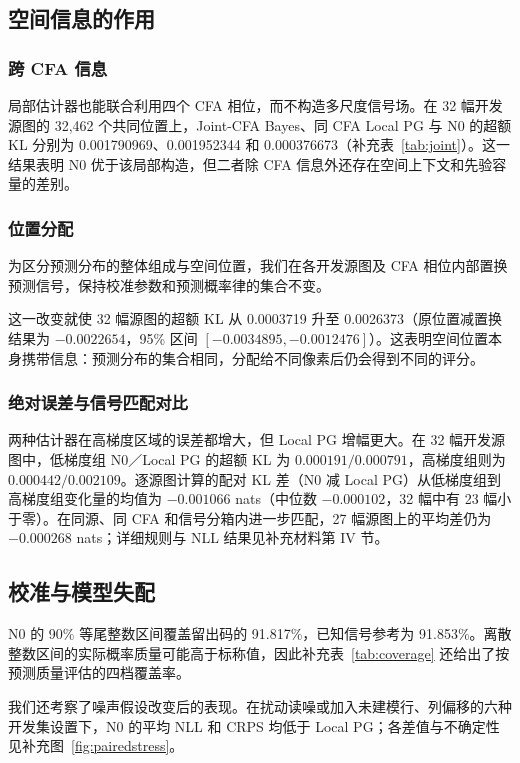 \documentclass[10pt,twocolumn,journal]{IEEEtran}
\begin{document}
\subsection{空间信息的作用}
\subsubsection{跨 CFA 信息}
局部估计器也能联合利用四个 CFA 相位，而不构造多尺度信号场。在 32 幅开发源图的 32,462 个共同位置上，Joint-CFA Bayes、同 CFA Local PG 与 N0 的超额 KL 分别为 0.001790969、0.001952344 和 0.000376673（补充表~\ref{tab:joint}）。这一结果表明 N0 优于该局部构造，但二者除 CFA 信息外还存在空间上下文和先验容量的差别。

\subsubsection{位置分配}
为区分预测分布的整体组成与空间位置，我们在各开发源图及 CFA 相位内部置换预测信号，保持校准参数和预测概率律的集合不变。

这一改变就使 32 幅源图的超额 KL 从 0.0003719 升至 0.0026373（原位置减置换结果为 $-0.0022654$，95\% 区间 $[-0.0034895,-0.0012476]$）。这表明空间位置本身携带信息：预测分布的集合相同，分配给不同像素后仍会得到不同的评分。

\subsubsection{绝对误差与信号匹配对比}\label{sec:gradientcontrol}
两种估计器在高梯度区域的误差都增大，但 Local PG 增幅更大。在 32 幅开发源图中，低梯度组 N0／Local PG 的超额 KL 为 $0.000191/0.000791$，高梯度组则为 $0.000442/0.002109$。逐源图计算的配对 KL 差（N0 减 Local PG）从低梯度组到高梯度组变化量的均值为 $-0.001066$ nats（中位数 $-0.000102$，32 幅中有 23 幅小于零）。在同源、同 CFA 和信号分箱内进一步匹配，27 幅源图上的平均差仍为 $-0.000268$ nats；详细规则与 NLL 结果见补充材料第 IV 节。

\subsection{校准与模型失配}
N0 的 90\% 等尾整数区间覆盖留出码的 91.817\%，已知信号参考为 91.853\%。离散整数区间的实际概率质量可能高于标称值，因此补充表~\ref{tab:coverage} 还给出了按预测质量评估的四档覆盖率。





我们还考察了噪声假设改变后的表现。在扰动读噪或加入未建模行、列偏移的六种开发集设置下，N0 的平均 NLL 和 CRPS 均低于 Local PG；各差值与不确定性见补充图~\ref{fig:pairedstress}。
\end{document}
